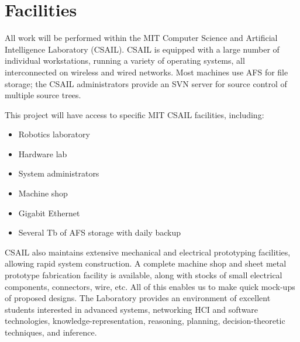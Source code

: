\section{Facilities}
\label{facilities}
%
All work will be performed within the MIT Computer Science and
Artificial Intelligence Laboratory (CSAIL).  CSAIL is equipped with a
large number of individual workstations, running a variety of operating
systems, all interconnected on wireless and wired networks.  Most
machines use AFS for file storage; the CSAIL administrators provide an
SVN server for source control of multiple source trees.

This project will have access to specific MIT CSAIL facilities,
including:
\begin{itemize}

\item Robotics laboratory

\item Hardware lab

\item System administrators

\item Machine shop

\item Gigabit Ethernet

\item Several Tb of AFS storage with daily backup

\end{itemize}

CSAIL also maintains extensive mechanical and electrical prototyping
facilities, allowing rapid system construction. A complete machine shop
and sheet metal prototype fabrication facility is available, along with
stocks of small electrical components, connectors, wire, etc. All of
this enables us to make quick mock-ups of proposed designs.  The
Laboratory provides an environment of excellent students interested 
in advanced systems, networking HCI and software technologies,
knowledge-representation, reasoning, planning, decision-theoretic
techniques, and inference.
